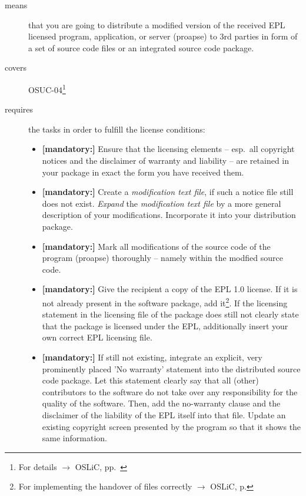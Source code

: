 \begin{description}
\item[means] that you are going to distribute a modified version of the received
EPL licensed program, application, or server (proapse) to 3rd parties in form
of a set of source code files or an integrated source code package.
\item[covers] OSUC-04\footnote{For details $\rightarrow$ OSLiC, pp.\ \pageref{OSUC-04-DEF}}
\item[requires] the tasks in order to fulfill the license conditions:
\begin{itemize}
  
  \item \textbf{[mandatory:]} Ensure that the licensing elements -- esp.\ all
  copyright notices and the disclaimer of warranty and liability -- are retained
  in your package in exact the form you have received them.
  
  \item \textbf{[mandatory:]} Create a \emph{modification text file}, if such a
  notice file still does not exist. \emph{Expand} the \emph{modification text
  file} by a more general description of your modifications. Incorporate it into
  your distribution package.
  
  \item \textbf{[mandatory:]} Mark all modifications of the source code of the
  program (proapse) thoroughly -- namely within the
  modfied source code.
  
  \item \textbf{[mandatory:]} Give the recipient a copy of the EPL 1.0 license.
  If it is not already present in the software package, add it\footnote{For
  implementing the handover of files correctly $\rightarrow$ OSLiC, p.
  \pageref{DistributingFilesHint}}. If the licensing statement in the licensing
  file of the package does still not clearly state that the package is licensed
  under the EPL, additionally insert your own correct EPL licensing file.

  \item \textbf{[mandatory:]} If still not existing, integrate an explicit, very
  prominently placed 'No warranty' statement into the distributed source code
  package. Let this statement clearly say that all (other) contributors to the
  software do not take over any responsibility for the quality of the software.
  Then, add the no-warranty clause and the disclaimer of the liability of the
  EPL itself into that file. Update an existing copyright screen presented by
  the program so that it shows the same information.


\end{itemize}
\end{description}
